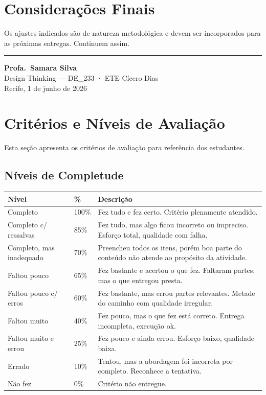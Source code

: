 \documentclass[
  sigconf,
  nonacm, %
  language=portuguese
]{acmart}
\begin{document}
\section{Considerações Finais}

Os ajustes indicados são de natureza metodológica e devem ser
incorporados para as próximas entregas.
Continuem assim.


\vspace{1.5em}
\noindent\rule{\linewidth}{0.4pt}

\begin{flushright}
\textbf{Profa.\ Samara Silva}\\
{\small\color{cmuted} Design Thinking --- DE\_233 · ETE Cícero Dias}\\
{\small\color{cmuted} Recife, 1 de junho de 2026}
\end{flushright}


\appendix
\onecolumn
\section{Critérios e Níveis de Avaliação}

Esta seção apresenta os critérios de avaliação para referência dos estudantes.

\subsection{Níveis de Completude}

\begin{tabularx}{\linewidth}{@{} p{4cm} p{1.5cm} X @{}}
\toprule
\textbf{Nível} & \textbf{\%} & \textbf{Descrição} \\
\midrule
Completo & 100\% & Fez tudo e fez certo. Critério plenamente atendido. \\
Completo c/ ressalvas & 85\% & Fez tudo, mas algo ficou incorreto ou impreciso. Esforço total, qualidade com falha. \\
Completo, mas inadequado & 70\% & Preencheu todos os itens, porém boa parte do conteúdo não atende ao propósito da atividade. \\
Faltou pouco & 65\% & Fez bastante e acertou o que fez. Faltaram partes, mas o que entregou presta. \\
Faltou pouco c/ erros & 60\% & Fez bastante, mas errou partes relevantes. Metade do caminho com qualidade irregular. \\
Faltou muito & 40\% & Fez pouco, mas o que fez está correto. Entrega incompleta, execução ok. \\
Faltou muito e errou & 25\% & Fez pouco e ainda errou. Esforço baixo, qualidade baixa. \\
Errado & 10\% & Tentou, mas a abordagem foi incorreta por completo. Reconhece a tentativa. \\
Não fez & 0\% & Critério não entregue. \\
\bottomrule
\end{tabularx}
\end{document}

